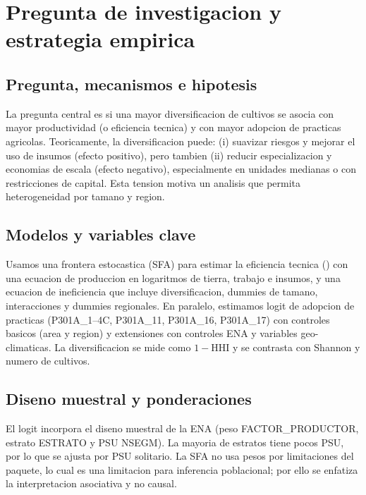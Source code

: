\documentclass[10pt,a4paper]{article}
\newcommand{\TE}{\text{TE}}
\begin{document}
\section{Pregunta de investigacion y estrategia empirica}

\subsection{Pregunta, mecanismos e hipotesis}
La pregunta central es si una mayor diversificacion de cultivos se asocia con mayor productividad (o eficiencia tecnica) y con mayor adopcion de practicas agricolas. Teoricamente, la diversificacion puede: (i) suavizar riesgos y mejorar el uso de insumos (efecto positivo), pero tambien (ii) reducir especializacion y economias de escala (efecto negativo), especialmente en unidades medianas o con restricciones de capital. Esta tension motiva un analisis que permita heterogeneidad por tamano y region.

\subsection{Modelos y variables clave}
Usamos una frontera estocastica (SFA) para estimar la eficiencia tecnica (\TE) con una ecuacion de produccion en logaritmos de tierra, trabajo e insumos, y una ecuacion de ineficiencia que incluye diversificacion, dummies de tamano, interacciones y dummies regionales. En paralelo, estimamos logit de adopcion de practicas (P301A\_1--4C, P301A\_11, P301A\_16, P301A\_17) con controles basicos (area y region) y extensiones con controles ENA y variables geo-climaticas. La diversificacion se mide como $1-\text{HHI}$ y se contrasta con Shannon y numero de cultivos.

\subsection{Diseno muestral y ponderaciones}
El logit incorpora el diseno muestral de la ENA (peso FACTOR\_PRODUCTOR, estrato ESTRATO y PSU NSEGM). La mayoria de estratos tiene pocos PSU, por lo que se ajusta por PSU solitario. La SFA no usa pesos por limitaciones del paquete, lo cual es una limitacion para inferencia poblacional; por ello se enfatiza la interpretacion asociativa y no causal.

\end{document}
